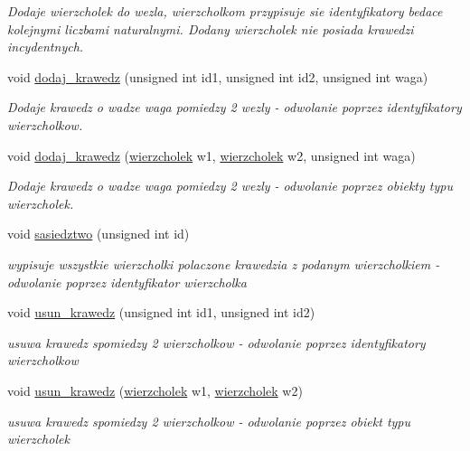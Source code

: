 \begin{DoxyCompactItemize}
\begin{DoxyCompactList}\small\item\em Dodaje wierzcholek do wezla, wierzcholkom przypisuje sie identyfikatory bedace kolejnymi liczbami naturalnymi. Dodany wierzcholek nie posiada krawedzi incydentnych. \end{DoxyCompactList}\item 
void \hyperlink{classgraf_af263156c2af2d8d2ec0d7ff0ee3dd9af}{dodaj\-\_\-krawedz} (unsigned int id1, unsigned int id2, unsigned int waga)
\begin{DoxyCompactList}\small\item\em Dodaje krawedz o wadze waga pomiedzy 2 wezly -\/ odwolanie poprzez identyfikatory wierzcholkow. \end{DoxyCompactList}\item 
void \hyperlink{classgraf_a8442b7d095a21024666b12c3e3f4184b}{dodaj\-\_\-krawedz} (\hyperlink{classwierzcholek}{wierzcholek} w1, \hyperlink{classwierzcholek}{wierzcholek} w2, unsigned int waga)
\begin{DoxyCompactList}\small\item\em Dodaje krawedz o wadze waga pomiedzy 2 wezly -\/ odwolanie poprzez obiekty typu wierzcholek. \end{DoxyCompactList}\item 
void \hyperlink{classgraf_a6a3ee98f332805da9c65749bacad27db}{sasiedztwo} (unsigned int id)
\begin{DoxyCompactList}\small\item\em wypisuje wszystkie wierzcholki polaczone krawedzia z podanym wierzcholkiem -\/ odwolanie poprzez identyfikator wierzcholka \end{DoxyCompactList}\item 
void \hyperlink{classgraf_aede977ec0f8660ad4a8c09449535cb74}{usun\-\_\-krawedz} (unsigned int id1, unsigned int id2)
\begin{DoxyCompactList}\small\item\em usuwa krawedz spomiedzy 2 wierzcholkow -\/ odwolanie poprzez identyfikatory wierzcholkow \end{DoxyCompactList}\item 
void \hyperlink{classgraf_a17cff8e4bdff073674dc95927221d128}{usun\-\_\-krawedz} (\hyperlink{classwierzcholek}{wierzcholek} w1, \hyperlink{classwierzcholek}{wierzcholek} w2)
\begin{DoxyCompactList}\small\item\em usuwa krawedz spomiedzy 2 wierzcholkow -\/ odwolanie poprzez obiekt typu wierzcholek \end{DoxyCompactList}\item 

\end{DoxyCompactItemize}
